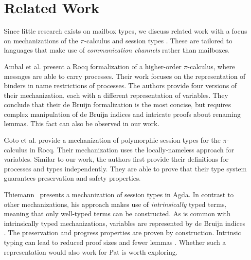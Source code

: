 \section{Related Work}
\label{chap:related-work}

Since little research exists on mailbox types, we discuss related work with a focus on mechanizations of the $\pi$-calculus and session types \cite{hondaTypesDyadicInteraction1993}.
These are tailored to languages that make use of \emph{communication channels} rather than mailboxes.

Ambal et al. \cite{ambalHOPiCoq2021} present a Rocq formalization of a higher-order $\pi$-calculus, where messages are able to carry processes.
Their work focuses on the representation of binders in name restrictions of processes.
The authors provide four versions of their mechanization, each with a different representation of variables.
They conclude that their de Bruijn formalization is the most concise, but requires complex manipulation of de Bruijn indices and intricate proofs about renaming lemmas.
This fact can also be observed in our work.

Goto et al. \cite{gotoExtensibleApproachSession2016} provide a mechanization of polymorphic session types for the $\pi$-calculus in Rocq.
Their mechanization uses the locally-nameless \cite{chargueraudLocallyNamelessRepresentation2012} approach for variables.
Similar to our work, the authors first provide their definitions for processes and types independently.
They are able to prove that their type system guarantees preservation and safety properties.

Thiemann~\cite{thiemannIntrinsicallyTypedMechanizedSemantics2019}
presents a mechanization of session types in Agda.
In contrast to other mechanizations, his approach makes use of
\emph{intrinsically} typed terms, meaning that
only well-typed terms can be constructed.
As is common with intrinsically typed mechanizations, variables are represented by de Bruijn indices \cite{wadlerProgrammingLanguageFoundations2022a}.
The preservation and progress properties are proven by construction.
Intrinsic typing can lead to reduced proof sizes and fewer lemmas \cite{wadlerProgrammingLanguageFoundations2022a}.
Whether such a representation would also work for Pat is worth exploring.

